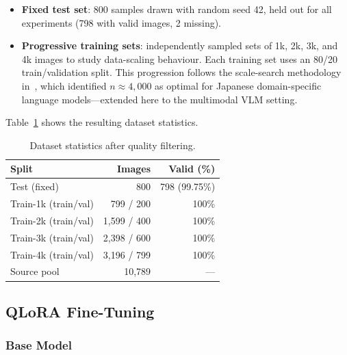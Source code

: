 \documentclass[twocolumn]{article}
\begin{document}
\begin{itemize}[leftmargin=*,itemsep=1pt]
  \item \textbf{Fixed test set}: 800 samples drawn with random seed 42, held
        out for all experiments (798 with valid images, 2 missing).
  \item \textbf{Progressive training sets}: independently sampled sets of
        1k, 2k, 3k, and 4k images to study data-scaling behaviour.
        Each training set uses an 80/20 train/validation split.
        This progression follows the scale-search methodology
        in~\cite{yasuno2026japanese}, which identified $n\approx4{,}000$
        as optimal for Japanese domain-specific language models---extended
        here to the multimodal VLM setting.
\end{itemize}

Table~\ref{tab:dataset} shows the resulting dataset statistics.

\begin{table}[h]
\centering
\caption{Dataset statistics after quality filtering.}
\label{tab:dataset}
\begin{tabular}{lrr}
\toprule
\textbf{Split} & \textbf{Images} & \textbf{Valid (\%)} \\
\midrule
Test (fixed)          & 800   & 798 (99.75\%) \\
\midrule
Train-1k (train/val)  & 799 / 200   & 100\% \\
Train-2k (train/val)  & 1{,}599 / 400 & 100\% \\
Train-3k (train/val)  & 2{,}398 / 600 & 100\% \\
Train-4k (train/val)  & 3{,}196 / 799 & 100\% \\
\midrule
Source pool           & 10{,}789 & --- \\
\bottomrule
\end{tabular}
\end{table}

\subsection{QLoRA Fine-Tuning}
\label{sec:finetuning}

\subsubsection{Base Model}
\end{document}
